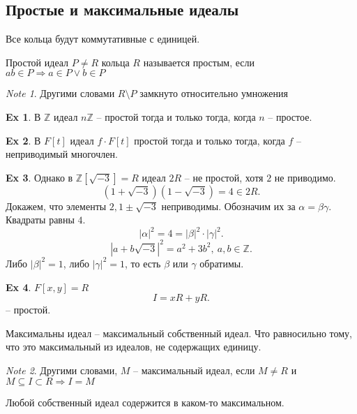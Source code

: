 \documentclass[11pt]{book}
\newcommand{\Z}{\mathbb{Z}}
\theoremstyle{definition}
\theoremstyle{plain}
\theoremstyle{plain}
\theoremstyle{definition}
\newtheorem*{ex}{Ex}
\theoremstyle{remark}
\newtheorem*{note}{Note}
\begin{document}
\subsection{Простые и максимальные идеалы}
Все кольца будут коммутативные с единицей.
\begin{defn}
    Простой идеал $ P \ne R$ кольца $ R$ называется простым, если $ ab \in  P \Rightarrow a \in  P \vee b \in  P$ 
\end{defn}
\begin{note}
    Другими словами $ R \setminus P$ замкнуто относительно умножения
\end{note}
\begin{ex}
    В $ \Z$ идеал $ n\Z$ -- простой тогда и только тогда, когда  $ n $ -- простое.
\end{ex}
\begin{ex}
    В $ F[t]$ идеал $ f \cdot F[t]$ простой тогда и только тогда, когда $ f$ -- неприводимый многочлен.
\end{ex}
\begin{ex}
    Однако в $ \Z[\sqrt{-3}]=R$  идеал $ 2R$ -- не простой, хотя $ 2$ не приводимо.
	\[
	    (1 + \sqrt{-3})(1-\sqrt{-3}) = 4 \in  2R
	.\] 
	Докажем, что элементы $ 2, 1 \pm \sqrt{-3}$ неприводимы.   Обозначим их за $ \alpha  = \beta \gamma$. Квадраты равны  $ 4$. 
	\[
	| \alpha |^2 = 4 = | \beta |^2 \cdot | \gamma|^2
	.\] 
	\[
	    |a + b\sqrt{-3}| ^2 = a^2+ 3 b^2, ~a, b \in  \Z 
	.\] 		
	Либо $ | \beta |^2 = 1$, либо $ | \gamma|^2 = 1$, то есть $ \beta $ или $ \gamma$ обратимы.
\end{ex}
\begin{ex}
    $ F[x, y] = R$
     \[
    I = xR + yR
    .\] -- простой.
\end{ex}
\begin{defn}
    Максимальны идеал -- максимальный собственный идеал. 
    Что равносильно тому, что это максимальный из идеалов, не содержащих единицу.
\end{defn}
\begin{note}
     Другими словами, $ M$ -- максимальный идеал, если $ M \ne R$ и $ M \subseteq I \subset R \Rightarrow I = M$
\end{note}
\begin{thm}
    Любой собственный идеал содержится в каком-то максимальном.
\end{thm}
\end{document}
